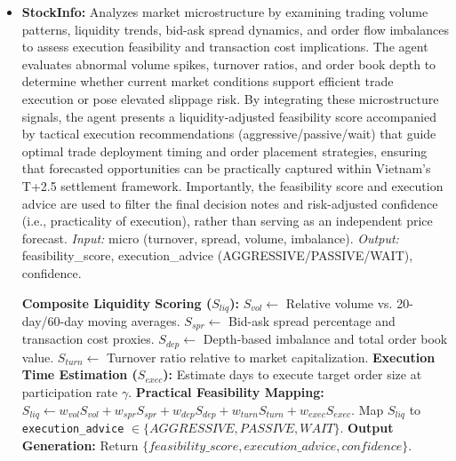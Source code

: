 \documentclass{ieeeaccess}
\begin{document}
\begin{itemize}
    \item \textbf{StockInfo:} 
    Analyzes market microstructure by examining trading volume patterns, liquidity trends, bid-ask spread dynamics, and order flow imbalances to assess execution feasibility and transaction cost implications. The agent evaluates abnormal volume spikes, turnover ratios, and order book depth to determine whether current market conditions support efficient trade execution or pose elevated slippage risk. By integrating these microstructure signals, the agent presents a liquidity-adjusted feasibility score accompanied by tactical execution recommendations (aggressive/passive/wait) that guide optimal trade deployment timing and order placement strategies, ensuring that forecasted opportunities can be practically captured within Vietnam's T+2.5 settlement framework.  
    Importantly, the feasibility score and execution advice are used to filter the final decision notes and risk-adjusted confidence (i.e., practicality of execution), rather than serving as an independent price forecast.
    \textit{Input:} micro (turnover, spread, volume, imbalance).  
    \textit{Output:} feasibility\_score, execution\_advice (AGGRESSIVE/PASSIVE/WAIT), confidence.

    \begin{breakablealgorithm}
    \caption{StockInfo microstructure analysis}
    \begin{algorithmic}[1]
    \STATE \textbf{Composite Liquidity Scoring ($S_{liq}$):}
    \STATE \quad $S_{vol} \gets$ Relative volume vs. 20-day/60-day moving averages.
    \STATE \quad $S_{spr} \gets$ Bid-ask spread percentage and transaction cost proxies.
    \STATE \quad $S_{dep} \gets$ Depth-based imbalance and total order book value.
    \STATE \quad $S_{turn} \gets$ Turnover ratio relative to market capitalization.
    \STATE \textbf{Execution Time Estimation ($S_{exec}$):}
    \STATE \quad Estimate days to execute target order size at participation rate $\gamma$.
    \STATE \textbf{Practical Feasibility Mapping:}
    \STATE \quad $S_{liq} \gets w_{vol}S_{vol} + w_{spr}S_{spr} + w_{dep}S_{dep} + w_{turn}S_{turn} + w_{exec}S_{exec}$.
    \STATE \quad Map $S_{liq}$ to \texttt{execution\_advice} $\in \{AGGRESSIVE, PASSIVE, WAIT\}$.
    \STATE \textbf{Output Generation:}
    \STATE \quad Return $\{feasibility\_score, execution\_advice, confidence\}$.
    \end{algorithmic}
    \end{breakablealgorithm}
\end{itemize}
\end{document}
